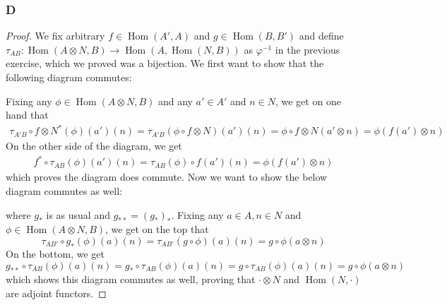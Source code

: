 \documentclass{article}
\DeclareMathOperator{\Hom}{Hom}
\begin{document}
\subsubsection{D}\label{1.5.D}
\begin{proof}
    We fix arbitrary $f\in \Hom(A',A)$ and $g\in \Hom(B,B')$ and define \\$\tau_{AB}:\Hom(A\otimes N,B)\to \Hom(A, \Hom(N,B))$ as $\varphi^{-1}$ in the previous exercise, which we proved was a bijection. We first want to show that the following diagram commutes:
    \begin{center}
    \end{center}
    Fixing any $\phi \in \Hom(A\otimes N,B)$ and any $a'\in A'$ and $n\in N$, we get on one hand that
    \begin{align*}
        \tau_{A'B}\circ f\otimes N^*(\phi)(a')(n)=\tau_{A'B}(\phi \circ f\otimes N)(a')(n)=\phi\circ f\otimes N(a'\otimes n)=\phi(f(a')\otimes n)
    \end{align*}
    On the other side of the diagram, we get
    \begin{align*}
        f^*\circ \tau_{AB}(\phi)(a')(n)=\tau_{AB}(\phi)\circ f(a')(n)=\phi(f(a')\otimes n)
    \end{align*}
    which proves the diagram does commute. Now we want to show the below diagram commutes as well:
    \begin{center}
    \end{center}
    where $g_*$ is as usual and $g_{**}=(g_*)_*$. Fixing any $a\in A, n\in N$ and $\phi\in \Hom(A\otimes N,B)$, we get on the top that
    \[
    \tau_{AB'}\circ g_*(\phi)(a)(n)=\tau_{AB'}(g\circ \phi)(a)(n)=g\circ \phi(a\otimes n)
    \]
    On the bottom, we get
    \[
    g_{**}\circ \tau_{AB}(\phi)(a)(n)=g_*\circ \tau_{AB}(\phi)(a)(n)=g\circ \tau_{AB}(\phi)(a)(n)=g\circ \phi(a\otimes n)
    \]
    which shows this diagram commutes as well, proving that $\cdot \otimes N$ and $\Hom(N,\cdot)$ are adjoint functors.
\end{proof}
\end{document}
